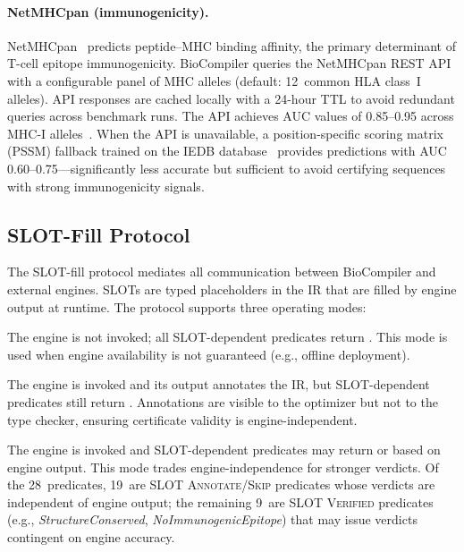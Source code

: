 \paragraph{NetMHCpan (immunogenicity).}
NetMHCpan~\cite{reynisson2020netmhcpan} predicts peptide--MHC binding
affinity, the primary determinant of T-cell epitope immunogenicity.
BioCompiler queries the NetMHCpan REST API with a configurable panel of
MHC alleles (default: 12~common HLA class~I alleles).  API responses are
cached locally with a 24-hour TTL to avoid redundant queries across
benchmark runs.  The API achieves AUC values of 0.85--0.95 across MHC-I
alleles~\cite{reynisson2020netmhcpan}.  When the API is unavailable, a
position-specific scoring matrix (PSSM) fallback trained on the IEDB
database~\cite{vita2019iedb} provides predictions with AUC
0.60--0.75---significantly less accurate but sufficient to avoid
certifying sequences with strong immunogenicity signals.

\subsection{SLOT-Fill Protocol}\label{sec:slot}

The SLOT-fill protocol mediates all communication between BioCompiler and
external engines.  SLOTs are typed placeholders in the IR that are filled
by engine output at runtime.  The protocol supports three operating
modes:

\begin{description}[leftmargin=!,labelwidth=2.8cm,itemsep=1pt,topsep=1pt]
\item[SLOT \textsc{Skip}:]
The engine is not invoked; all SLOT-dependent predicates return
\UNCERTAIN.  This mode is used when engine availability is not
guaranteed (e.g., offline deployment).

\item[SLOT \textsc{Annotate}:]
The engine is invoked and its output annotates the IR, but
SLOT-dependent predicates still return \UNCERTAIN.  Annotations are
visible to the optimizer but not to the type checker, ensuring
certificate validity is engine-independent.

\item[SLOT \textsc{Verified}:]
The engine is invoked and SLOT-dependent predicates may return \PASS{}
or \FAIL{} based on engine output.  This mode trades engine-independence
for stronger verdicts.  Of the 28~predicates, 19~are SLOT
\textsc{Annotate}/\textsc{Skip} predicates whose verdicts are
independent of engine output; the remaining 9~are SLOT \textsc{Verified}
predicates (e.g., \emph{StructureConserved}, \emph{NoImmunogenicEpitope})
that may issue \PASS{} verdicts contingent on engine accuracy.
\end{description}

